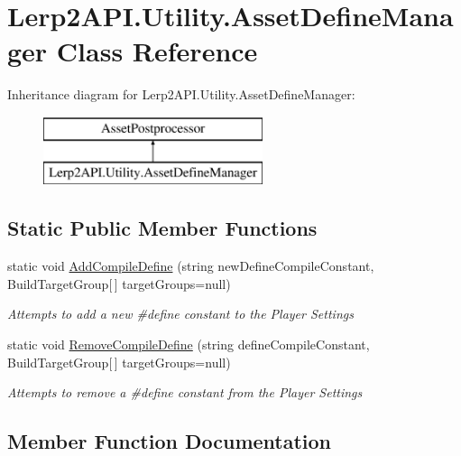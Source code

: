 \hypertarget{class_lerp2_a_p_i_1_1_utility_1_1_asset_define_manager}{}\section{Lerp2\+A\+P\+I.\+Utility.\+Asset\+Define\+Manager Class Reference}
\label{class_lerp2_a_p_i_1_1_utility_1_1_asset_define_manager}
Inheritance diagram for Lerp2\+A\+P\+I.\+Utility.\+Asset\+Define\+Manager\+:\begin{figure}[H]
\begin{center}
\leavevmode
\includegraphics[height=2.000000cm]{class_lerp2_a_p_i_1_1_utility_1_1_asset_define_manager}
\end{center}
\end{figure}
\subsection*{Static Public Member Functions}
\begin{DoxyCompactItemize}
\item 
static void \hyperlink{class_lerp2_a_p_i_1_1_utility_1_1_asset_define_manager_a28688c397b8b972e446b5522e657d467}{Add\+Compile\+Define} (string new\+Define\+Compile\+Constant, Build\+Target\+Group\mbox{[}$\,$\mbox{]} target\+Groups=null)
\begin{DoxyCompactList}\small\item\em Attempts to add a new \#define constant to the Player Settings \end{DoxyCompactList}\item 
static void \hyperlink{class_lerp2_a_p_i_1_1_utility_1_1_asset_define_manager_a3a1590728fc4b737b7ef2a69701a6a3e}{Remove\+Compile\+Define} (string define\+Compile\+Constant, Build\+Target\+Group\mbox{[}$\,$\mbox{]} target\+Groups=null)
\begin{DoxyCompactList}\small\item\em Attempts to remove a \#define constant from the Player Settings \end{DoxyCompactList}\end{DoxyCompactItemize}


\subsection{Member Function Documentation}
\mbox{\label{class_lerp2_a_p_i_1_1_utility_1_1_asset_define_manager_a28688c397b8b972e446b5522e657d467}} 
